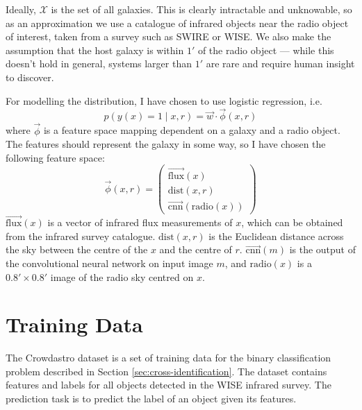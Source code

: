 \documentclass[11pt]{book}
\begin{document}
    Ideally, $\mathcal X$ is the set of all galaxies. This is clearly
    intractable and unknowable, so as an approximation we use a catalogue of
    infrared objects near the radio object of interest, taken from a survey
    such as SWIRE or WISE. We also make the assumption that the host galaxy is
    within $1'$ of the radio object --- while this doesn't hold in general,
    systems larger than $1'$ are rare and require human insight to
    discover\cite{banfield16}.

    For modelling the distribution, I have chosen to use logistic regression,
    i.e.
    \begin{equation}
        \label{eq:logistic-regression-cross-identification}
        p(y(x) = 1 \mid x, r) = \vec w \cdot \vec \phi(x, r)
    \end{equation}
    where $\vec \phi$ is a feature space mapping dependent on a galaxy and a
    radio object. The features should represent the galaxy in some way, so I
    have chosen the following feature space:
    \begin{equation}
        \label{eq:galaxy-features}
        \vec \phi(x, r) = \begin{pmatrix}
            \vec{\mbox{flux}}(x)\\
            \mbox{dist}(x, r)\\
            \vec{\mbox{cnn}}(\mbox{radio}(x))
        \end{pmatrix}
    \end{equation}
    $\vec{\mbox{flux}}(x)$ is a vector of infrared flux measurements of $x$,
    which can be obtained from the infrared survey catalogue. $\mbox{dist}(x,
    r)$ is the Euclidean distance across the sky between the centre of the $x$
    and the centre of $r$. $\vec{\mbox{cnn}}(m)$ is the output of the
    convolutional neural network on input image $m$, and $\mbox{radio}(x)$ is a
    $0.8' \times 0.8'$ image of the radio sky centred on $x$.

\section{Training Data}
\label{sec:training-data}
  
  The Crowdastro dataset is a set of training data for the binary
  classification problem described in Section \ref{sec:cross-identification}.
  The dataset contains features and labels for all objects detected in the WISE
  infrared survey. The prediction task is to predict the label of an object
  given its features.
\end{document}
